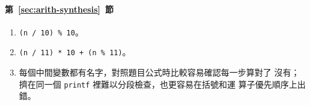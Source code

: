 \paragraph{第~\ref{sec:arith-synthesis}~節}
\begin{enumerate}
\item \texttt{(n / 10) \% 10}。
\item \texttt{(n / 11) * 10 + (n \% 11)}。
\item 每個中間變數都有名字，對照題目公式時比較容易確認每一步算對了
沒有；擠在同一個 \texttt{printf} 裡難以分段檢查，也更容易在括號和運
算子優先順序上出錯。
\end{enumerate}
